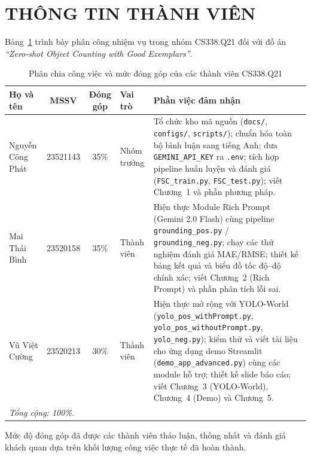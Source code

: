 \documentclass[a4paper,12pt]{report}
\numberwithin{figure}{chapter}
\numberwithin{table}{chapter}
\begin{document}
\chapter*{THÔNG TIN THÀNH VIÊN}

Bảng~\ref{tab:phan_cong} trình bày phân công nhiệm vụ trong nhóm CS338.Q21 đối với đồ án \textit{“Zero-shot Object Counting with Good Exemplars”}.

\begin{table}[H]
\centering
\renewcommand{\arraystretch}{1.25}
\begin{tabular}{|l|c|c|l|p{6cm}|}
\hline
\textbf{Họ và tên} & \textbf{MSSV} & \textbf{Đóng góp} & \textbf{Vai trò} & \textbf{Phần việc đảm nhận} \\
\hline
Nguyễn Công Phát & 23521143 & 35\% & Nhóm trưởng &
Tổ chức kho mã nguồn (\texttt{docs/}, \texttt{configs/}, \texttt{scripts/}); chuẩn hóa toàn bộ bình luận sang tiếng Anh; đưa \texttt{GEMINI\_API\_KEY} ra \texttt{.env}; tích hợp pipeline huấn luyện và đánh giá (\texttt{FSC\_train.py}, \texttt{FSC\_test.py}); viết Chương~1 và phần phương pháp. \\
\hline
Mai Thái Bình & 23520158 & 35\% & Thành viên &
Hiện thực Module Rich Prompt (Gemini 2.0 Flash) cùng pipeline \texttt{grounding\_pos.py} / \texttt{grounding\_neg.py}; chạy các thử nghiệm đánh giá MAE/RMSE; thiết kế bảng kết quả và biểu đồ tốc độ--độ chính xác; viết Chương~2 (Rich Prompt) và phần phân tích lỗi sai. \\
\hline
Vũ Việt Cường & 23520213 & 30\% & Thành viên &
Hiện thực mở rộng với YOLO-World (\texttt{yolo\_pos\_withPrompt.py}, \texttt{yolo\_pos\_withoutPrompt.py}, \texttt{yolo\_neg.py}); kiểm thử và viết tài liệu cho ứng dụng demo Streamlit (\texttt{demo\_app\_advanced.py}) cùng các module hỗ trợ; thiết kế slide báo cáo; viết Chương~3 (YOLO-World), Chương~4 (Demo) và Chương~5. \\
\hline
\multicolumn{5}{|l|}{\textit{Tổng cộng: 100\%.}} \\
\hline
\end{tabular}
\caption{Phân chia công việc và mức đóng góp của các thành viên CS338.Q21}
\label{tab:phan_cong}
\end{table}

Mức độ đóng góp đã được các thành viên thảo luận, thống nhất và đánh giá khách quan dựa trên khối lượng công việc thực tế đã hoàn thành.

\end{document}
